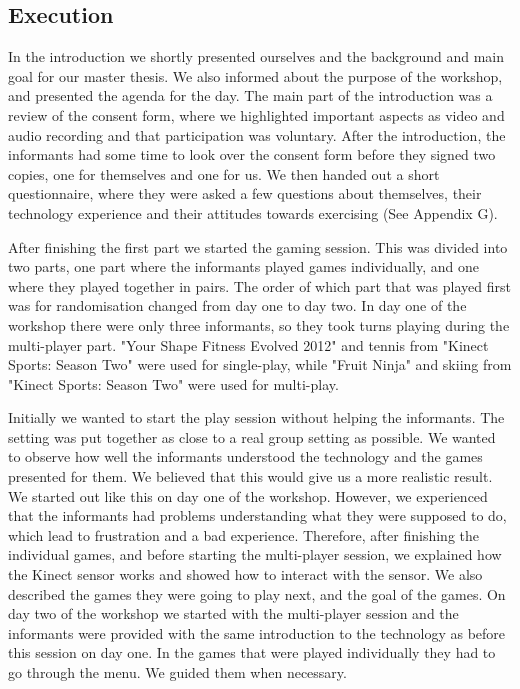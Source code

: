 \subsection{Execution}
In the introduction we shortly presented ourselves and the background and main goal for our master thesis. We also informed about the purpose of the workshop, and presented the agenda for the day. The main part of the introduction was a review of the consent form, where we highlighted important aspects as video and audio recording and that participation was voluntary. After the introduction, the informants had some time to look over the consent form before they signed two copies, one for themselves and one for us. We then handed out a short questionnaire, where they were asked a few questions about themselves, their technology experience and their attitudes towards exercising (See Appendix G).

After finishing the first part we started the gaming session. This was divided into two parts, one part where the informants played games individually, and one where they played together in pairs. The order of which part that was played first was for randomisation changed from day one to day two. In day one of the workshop there were only three informants, so they took turns playing during the multi-player part. "Your Shape Fitness Evolved 2012" and tennis from "Kinect Sports: Season Two" were used for single-play, while "Fruit Ninja" and skiing from "Kinect Sports: Season Two" were used for multi-play. 

Initially we wanted to start the play session without helping the informants. The setting was put together as close to a real group setting as possible. We wanted to observe how well the informants understood the technology and the games presented for them. We believed that this would give us a more realistic result. We started out like this on day one of the workshop. However, we experienced that the informants had problems understanding what they were supposed to do, which lead to frustration and a bad experience. Therefore, after finishing the individual games, and before starting the multi-player session, we explained how the Kinect sensor works and showed how to interact with the sensor. We also described the games they were going to play next, and the goal of the games. On day two of the workshop we started with the multi-player session and the informants were provided with the same introduction to the technology as before this session on day one. In the games that were played individually they had to go through the menu. We guided them when necessary. 

